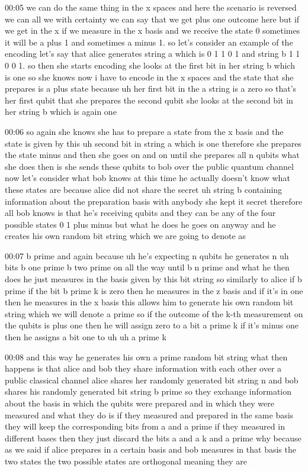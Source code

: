 00:05
we can do the same thing in the x spaces and here the scenario is reversed
we can all we with certainty we can say that we get plus one
outcome here but if we get in the x if we measure in the x basis and we
receive the state 0 sometimes it will be a plus 1 and sometimes a minus 1.
so let's consider an example of the encoding
let's say that alice generates string a which is 0 1 1 0 1 and string b
1 1 0 0 1. so then she starts encoding she looks at the first
bit in her string b which is one so she knows now i have to encode in the x
spaces and the state that she prepares is a plus state
because uh her first bit in the a string is a zero
so that's her first qubit that she prepares the second qubit
she looks at the second bit in her string b which is again one

00:06
so again she knows she has to prepare a state from the x basis
and the state is given by this uh second bit in string a which is one
therefore she prepares the state minus and then she goes on and on until she
prepares all n qubits what she does then is she sends these qubits to bob
over the public quantum channel now let's consider what bob knows at this time
he actually doesn't know what these states are
because alice did not share the secret uh string b containing information about
the preparation basis with anybody she kept it secret
therefore all bob knows is that he's receiving qubits and they can be
any of the four possible states 0 1 plus minus
but what he does he goes on anyway and he creates his own
random bit string which we are going to denote as

00:07
b prime and again because uh he's expecting n qubits
he generates n uh bits b one prime b two prime on
all the way until b n prime and what he then does
he just measures in the basis given by this bit string so
similarly to alice if b prime if the bit b prime k is zero then he
measures in the z basis and if it's in one then he measures in the x basis
this allows him to generate his own random bit string which we will denote a
prime so if the outcome of the k-th measurement
on the qubits is plus one then he will assign zero to a bit a prime k
if it's minus one then he assigns a bit one to uh uh a prime k

00:08
and this way he generates his own a prime random bit string
what then happens is that alice and bob they share information with each other
over a public classical channel alice shares her randomly generated bit string n
and bob shares his randomly generated bit string b prime
so they exchange information about the basis in which the qubits were prepared
and in which they were measured and what they do is if they measured and
prepared in the same basis they will keep the corresponding bits from
a and a prime if they measured in different bases then they just discard
the bits a and a k and a prime why because as we said if alice prepares in
a certain basis and bob measures in that basis the two
states the two possible states are orthogonal meaning they are

